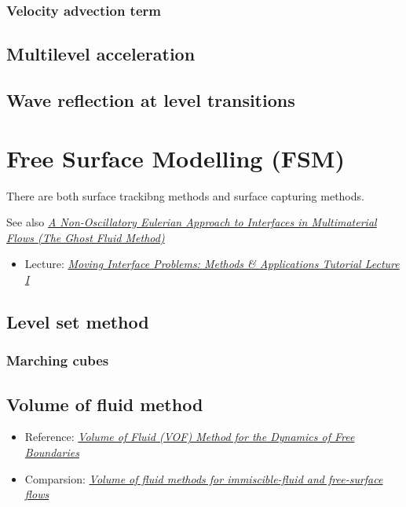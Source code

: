 \documentclass[]{report}
\begin{document}
\subsection{Velocity advection term}

\section{Multilevel acceleration}

\section{Wave reflection at level transitions}

\chapter{Free Surface Modelling (FSM)}

There are both surface trackibng methods and surface capturing methods.

See also \textit{\href{http://physbam.stanford.edu/~fedkiw/papers/cam1998-17.pdf}{A Non-Oscillatory Eulerian Approach to Interfaces in Multimaterial Flows (The Ghost Fluid Method)}}

\begin{itemize}
    \item Lecture: \textit{\href{http://www.ims.nus.edu.sg/Programs/fluiddynamic/files/Lecture1-basics.pdf}{Moving Interface Problems: Methods \& Applications Tutorial Lecture I}}
\end{itemize}

\section{Level set method}

\subsection{Marching cubes}

\section{Volume of fluid method}

\begin{itemize}
    \item Reference: \textit{\href{http://pages.csam.montclair.edu/~yecko/icodes/HirtNichols_Surfer_JCP1981.pdf}{Volume of Fluid (VOF) Method for the Dynamics of Free Boundaries}}
    \item Comparsion: \textit{\href{http://capfluidicslit.mme.pdx.edu/reference/Numerics/Gopala_ChemEngJ2008_VOFMethodsFreeSurfaceFlow.pdf}{Volume of fluid methods for immiscible-fluid and free-surface flows}}
\end{itemize}
\end{document}
